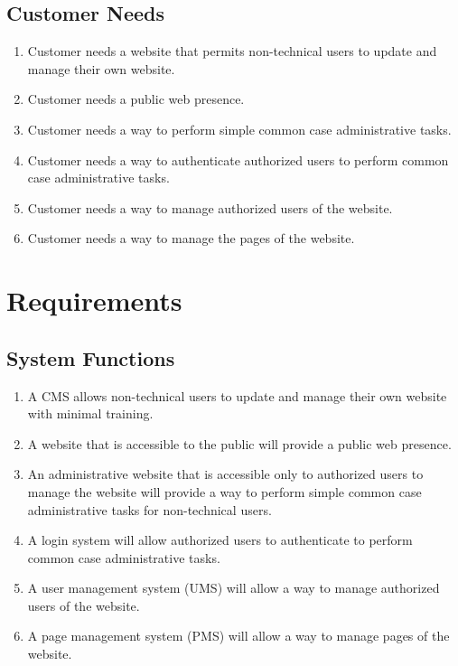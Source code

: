 \documentclass[11pt]{article}
\begin{document}
\subsection{Customer Needs}

\begin{enumerate}
  \item Customer needs a website that permits non-technical users to update and manage their own website.
  \item Customer needs a public web presence.
  \item Customer needs a way to perform simple common case administrative tasks.
  \item Customer needs a way to authenticate authorized users to perform common case administrative tasks.
  \item Customer needs a way to manage authorized users of the website.
  \item Customer needs a way to manage the pages of the website.
\end{enumerate}


\section{Requirements}

\subsection{System Functions}

\begin{enumerate}
  \item A CMS allows non-technical users to update and manage their own website with minimal training.
  \item A website that is accessible to the public will provide a public web presence.
  \item An administrative website that is accessible only to authorized users to manage the website will provide a way to perform simple common case administrative tasks for non-technical users.
  \item A login system will allow authorized users to authenticate to perform common case administrative tasks.
  \item A user management system (UMS) will allow a way to manage authorized users of the website.
  \item A page management system (PMS) will allow a way to manage pages of the website.
\end{enumerate}
\end{document}
